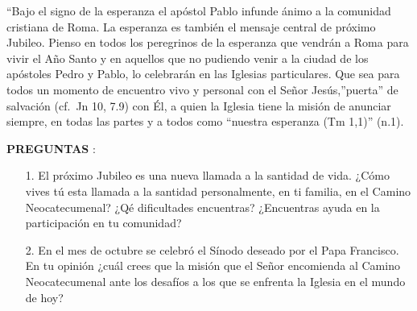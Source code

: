 \documentclass[
  12pt,
]{article}
\begin{document}
``Bajo el signo de la esperanza el apóstol Pablo infunde ánimo a la
comunidad cristiana de Roma. La esperanza es también el mensaje central
de próximo Jubileo. Pienso en todos los peregrinos de la esperanza que
vendrán a Roma para vivir el Año Santo y en aquellos que no pudiendo
venir a la ciudad de los apóstoles Pedro y Pablo, lo celebrarán en las
Iglesias particulares. Que sea para todos un momento de encuentro vivo y
personal con el Señor Jesús,''puerta'' de salvación (cf.~Jn 10, 7.9) con
Él, a quien la Iglesia tiene la misión de anunciar siempre, en todas las
partes y a todos como ``nuestra esperanza (Tm 1,1)'' (n.1).

\vspace{.3cm}

\textbf{PREGUNTAS} :

\begin{itemize}
    \item[1.] El próximo Jubileo es una nueva llamada a la santidad de vida. ¿Cómo  vives tú esta llamada a la santidad personalmente, en ti familia, en el Camino Neocatecumenal? ¿Qé dificultades encuentras? ¿Encuentras ayuda en la participación en tu comunidad?
    \item[2.] En el mes de octubre se celebró el Sínodo deseado por el Papa Francisco. En tu opinión ¿cuál crees que la misión que el Señor encomienda al Camino Neocatecumenal ante los desafíos a los que se enfrenta la Iglesia en el mundo de hoy?
\end{itemize}
\end{document}
